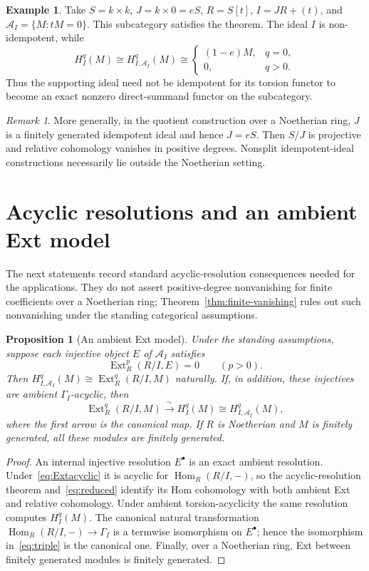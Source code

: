 \documentclass[11pt,reqno]{amsart}
\newtheorem{proposition}[theorem]{Proposition}
\theoremstyle{definition}
\newtheorem{example}[theorem]{Example}
\theoremstyle{remark}
\newtheorem{remark}[theorem]{Remark}
\newcommand{\Hom}{\operatorname{Hom}}
\newcommand{\Ext}{\operatorname{Ext}}
\newcommand{\A}{\mathcal A_I}
\begin{document}
\begin{example}
Take $S=k\times k$, $J=k\times0=eS$, $R=S[t]$, $I=JR+(t)$, and $\A=\{M:tM=0\}$. This subcategory satisfies the theorem. The ideal $I$ is non-idempotent, while
\[
H_I^q(M)\cong H_{I,\A}^q(M)\cong
\begin{cases}(1-e)M,&q=0,\\0,&q>0.\end{cases}
\]
Thus the supporting ideal need not be idempotent for its torsion functor to become an exact nonzero direct-summand functor on the subcategory.
\end{example}

\begin{remark}
More generally, in the quotient construction over a Noetherian ring, $J$ is a finitely generated idempotent ideal and hence $J=eS$. Then $S/J$ is projective and relative cohomology vanishes in positive degrees. Nonsplit idempotent-ideal constructions necessarily lie outside the Noetherian setting.
\end{remark}
\section{Acyclic resolutions and an ambient Ext model}
The next statements record standard acyclic-resolution consequences needed for the applications. They do not assert positive-degree nonvanishing for finite coefficients over a Noetherian ring; Theorem~\ref{thm:finite-vanishing} rules out such nonvanishing under the standing categorical assumptions.

\begin{proposition}[An ambient Ext model]\label{MainThm}
Under the standing assumptions, suppose each injective object $E$ of $\A$ satisfies
\begin{equation}\label{eq:Extacyclic}
\Ext_R^p(R/I,E)=0\qquad(p>0).
\end{equation}
Then $H_{I,\A}^q(M)\cong\Ext_R^q(R/I,M)$ naturally. If, in addition, these injectives are ambient $\Gamma_I$-acyclic, then
\begin{equation}\label{eq:triple}
\Ext_R^q(R/I,M)\xrightarrow{\ \sim\ }H_I^q(M)\cong H_{I,\A}^q(M),
\end{equation}
where the first arrow is the canonical map. If $R$ is Noetherian and $M$ is finitely generated, all these modules are finitely generated.
\end{proposition}
\begin{proof}
An internal injective resolution $E^\bullet$ is an exact ambient resolution. Under~\eqref{eq:Extacyclic} it is acyclic for $\Hom_R(R/I,-)$, so the acyclic-resolution theorem and~\eqref{eq:reduced} identify its Hom cohomology with both ambient Ext and relative cohomology. Under ambient torsion-acyclicity the same resolution computes $H_I^q(M)$. The canonical natural transformation $\Hom_R(R/I,-)\to\Gamma_I$ is a termwise isomorphism on $E^\bullet$; hence the isomorphism in~\eqref{eq:triple} is the canonical one. Finally, over a Noetherian ring, Ext between finitely generated modules is finitely generated.
\end{proof}
\end{document}
